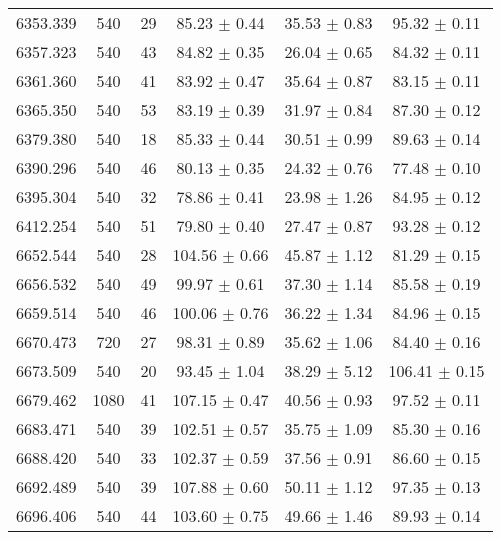 \documentclass[iop]{emulateapj}
\begin{document}
\begin{table}
\begin{tabular}{cccccc}
  6353.339  &  540  &  29 &  85.23  $\pm$    0.44  &   35.53  $\pm$    0.83  &   95.32  $\pm$    0.11   \\
  6357.323  &  540  &  43 &  84.82  $\pm$    0.35  &   26.04  $\pm$    0.65  &   84.32  $\pm$    0.11   \\
  6361.360  &  540  &  41 &  83.92  $\pm$    0.47  &   35.64  $\pm$    0.87  &   83.15  $\pm$    0.11   \\
  6365.350  &  540  &  53 &  83.19  $\pm$    0.39  &   31.97  $\pm$    0.84  &   87.30  $\pm$    0.12   \\
  6379.380  &  540  &  18 &  85.33  $\pm$    0.44  &   30.51  $\pm$    0.99  &   89.63  $\pm$    0.14   \\
  6390.296  &  540  &  46 &  80.13  $\pm$    0.35  &   24.32  $\pm$    0.76  &   77.48  $\pm$    0.10   \\
  6395.304  &  540  &  32 &  78.86  $\pm$    0.41  &   23.98  $\pm$    1.26  &   84.95  $\pm$    0.12   \\
  6412.254  &  540  &  51 &  79.80  $\pm$    0.40  &   27.47  $\pm$    0.87  &   93.28  $\pm$    0.12   \\
  6652.544  &  540  &  28 & 104.56  $\pm$    0.66  &   45.87  $\pm$    1.12  &   81.29  $\pm$    0.15   \\
  6656.532  &  540  &  49 &  99.97  $\pm$    0.61  &   37.30  $\pm$    1.14  &   85.58  $\pm$    0.19   \\
  6659.514  &  540  &  46 & 100.06  $\pm$    0.76  &   36.22  $\pm$    1.34  &   84.96  $\pm$    0.15   \\
  6670.473  &  720  &  27 &  98.31  $\pm$    0.89  &   35.62  $\pm$    1.06  &   84.40  $\pm$    0.16   \\
  6673.509  &  540  &  20 &  93.45  $\pm$    1.04  &   38.29  $\pm$    5.12  &  106.41  $\pm$    0.15   \\
  6679.462  & 1080  &  41 & 107.15  $\pm$    0.47  &   40.56  $\pm$    0.93  &   97.52  $\pm$    0.11   \\
  6683.471  &  540  &  39 & 102.51  $\pm$    0.57  &   35.75  $\pm$    1.09  &   85.30  $\pm$    0.16   \\
  6688.420  &  540  &  33 & 102.37  $\pm$    0.59  &   37.56  $\pm$    0.91  &   86.60  $\pm$    0.15   \\
  6692.489  &  540  &  39 & 107.88  $\pm$    0.60  &   50.11  $\pm$    1.12  &   97.35  $\pm$    0.13   \\
  6696.406  &  540  &  44 & 103.60  $\pm$    0.75  &   49.66  $\pm$    1.46  &   89.93  $\pm$    0.14   \\

\end{tabular}
\end{table}
\end{document}
